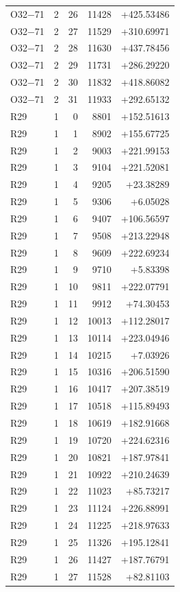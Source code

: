 \documentclass[journal,onecolumn,10pt]{IEEEtran}
\begin{document}
\begin{longtable}{llrrr}
O32$-$71 & 2 & 26 & 11428 & +425.53486 \\
O32$-$71 & 2 & 27 & 11529 & +310.69971 \\
O32$-$71 & 2 & 28 & 11630 & +437.78456 \\
O32$-$71 & 2 & 29 & 11731 & +286.29220 \\
O32$-$71 & 2 & 30 & 11832 & +418.86082 \\
O32$-$71 & 2 & 31 & 11933 & +292.65132 \\
R29 & 1 & 0 & 8801 & +152.51613 \\
R29 & 1 & 1 & 8902 & +155.67725 \\
R29 & 1 & 2 & 9003 & +221.99153 \\
R29 & 1 & 3 & 9104 & +221.52081 \\
R29 & 1 & 4 & 9205 & +23.38289 \\
R29 & 1 & 5 & 9306 & +6.05028 \\
R29 & 1 & 6 & 9407 & +106.56597 \\
R29 & 1 & 7 & 9508 & +213.22948 \\
R29 & 1 & 8 & 9609 & +222.69234 \\
R29 & 1 & 9 & 9710 & +5.83398 \\
R29 & 1 & 10 & 9811 & +222.07791 \\
R29 & 1 & 11 & 9912 & +74.30453 \\
R29 & 1 & 12 & 10013 & +112.28017 \\
R29 & 1 & 13 & 10114 & +223.04946 \\
R29 & 1 & 14 & 10215 & +7.03926 \\
R29 & 1 & 15 & 10316 & +206.51590 \\
R29 & 1 & 16 & 10417 & +207.38519 \\
R29 & 1 & 17 & 10518 & +115.89493 \\
R29 & 1 & 18 & 10619 & +182.91668 \\
R29 & 1 & 19 & 10720 & +224.62316 \\
R29 & 1 & 20 & 10821 & +187.97841 \\
R29 & 1 & 21 & 10922 & +210.24639 \\
R29 & 1 & 22 & 11023 & +85.73217 \\
R29 & 1 & 23 & 11124 & +226.88991 \\
R29 & 1 & 24 & 11225 & +218.97633 \\
R29 & 1 & 25 & 11326 & +195.12841 \\
R29 & 1 & 26 & 11427 & +187.76791 \\
R29 & 1 & 27 & 11528 & +82.81103 \\

\end{longtable}
\end{document}
